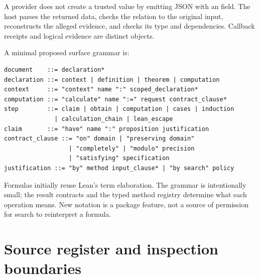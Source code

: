 \documentclass[11pt,a4paper]{article}
\newcommand{\code}[1]{\texttt{\detokenize{#1}}}
\theoremstyle{remark}
\begin{document}
A provider does not create a trusted \code{Certified} value by emitting JSON
with an \code{evidence} field. The host parses the returned data, checks the
relation to the original input, reconstructs the alleged evidence, and checks
its type and dependencies. Callback receipts and logical evidence are distinct
objects.

A minimal proposed surface grammar is:
\par\smallskip\noindent\begin{minipage}{\linewidth}
\begin{lstlisting}
document    ::= declaration*
declaration ::= context | definition | theorem | computation
context     ::= "context" name ":" scoped_declaration*
computation ::= "calculate" name ":=" request contract_clause*
step        ::= claim | obtain | computation | cases | induction
              | calculation_chain | lean_escape
claim       ::= "have" name ":" proposition justification
contract_clause ::= "on" domain | "preserving domain"
                  | "completely" | "modulo" precision
                  | "satisfying" specification
justification ::= "by" method input_clause* | "by search" policy
\end{lstlisting}
\end{minipage}\par\smallskip
Formulas initially reuse Lean's term elaboration. The grammar is intentionally
small; the result contracts and the typed method registry determine what each
operation means. New notation is a package feature, not a source of permission
for search to reinterpret a formula.

\section{Source register and inspection boundaries}
\label{app:sources}
\end{document}

